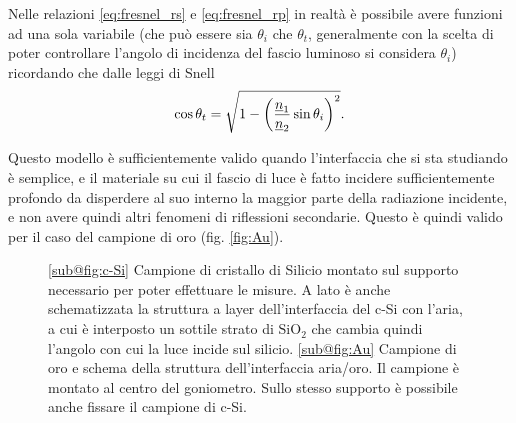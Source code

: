 \documentclass[
    prb,altaffilletter,citeautoscript,
    amsmath,amssymb,
    showpacs,showkeys,floatfix,
    reprint
]{revtex4-1}
\begin{document}
Nelle relazioni \eqref{eq:fresnel_rs} e \eqref{eq:fresnel_rp} in realtà è possibile avere funzioni ad una sola variabile (che può essere sia $\theta_i$ che $\theta_t$, generalmente con la scelta di poter controllare l'angolo di incidenza del fascio luminoso si considera $\theta_i$) ricordando che dalle leggi di Snell \begin{equation}
    \cos\theta_t = \sqrt{1-\qty(\frac{\underline n_1}{\underline n_2}\sin\theta_i)^2}.
    \label{eq:snell}
\end{equation}

Questo modello è sufficientemente valido quando l'interfaccia che si sta studiando è semplice, e il materiale su cui il fascio di luce è fatto incidere sufficientemente profondo da disperdere al suo interno la maggior parte della radiazione incidente, e non avere quindi altri fenomeni di riflessioni secondarie. Questo è quindi valido per il caso del campione di oro (fig. \ref{fig:Au}).

\begin{figure}
    \centering
    \caption{\ref{sub@fig:c-Si} Campione di  cristallo di Silicio montato sul supporto necessario per poter effettuare le misure. A lato è anche schematizzata la struttura a layer dell'interfaccia del c-Si con l'aria, a cui è interposto un sottile strato di $\mathrm{SiO_2}$ che cambia quindi l'angolo con cui la luce incide sul silicio. \ref{sub@fig:Au} Campione di oro e schema della struttura dell'interfaccia aria/oro. Il campione è montato al centro del goniometro. Sullo stesso supporto è possibile anche fissare il campione di c-Si.}
    \label{fig:c-Si/Au_samples}
\end{figure}
\end{document}
